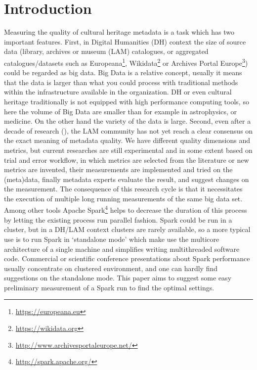 \section{Introduction}
Measuring the quality of cultural heritage metadata is a task which has two important features. First, in Digital Humanities (DH) context the size of source data (library, archives or museum (LAM) catalogues, or aggregated catalogues/datasets such as Europeana\footnote{\url{https://europeana.eu}}, Wikidata\footnote{\url{https://wikidata.org}} or Archives Portal Europe\footnote{\url{http://www.archivesportaleurope.net/}}) could be regarded as big data. Big Data is a relative concept, usually it means that the data is larger than what you could process with traditional methods within the infrastructure available in the organization. DH or even cultural heritage traditionally is not equipped with high performance computing tools, so here the volume of Big Data are smaller than for example in astrophysics, or medicine. On the other hand the variety of the data is large. Second, even after a decade of research (\cite{zotero-bibliography}), the LAM community has not yet reach a clear consensus on the exact meaning of metadata quality. We have different quality dimensions and metrics, but current researches are still experimental and in some extent based on trial and error workflow, in which metrics are selected from the literature or new metrics are invented, their measurements are implemented and tried on the (meta)data, finally metadata experts evaluate the result, and suggest changes on the measurement. The consequence of this research cycle is that it necessitates the execution of multiple long running measurements of the same big data set. Among other tools Apache Spark\footnote{\url{http://spark.apache.org/}} helps to decrease the duration of this process by letting the existing process run parallel fashion. Spark could be run in a cluster, but in a DH/LAM context clusters are rarely available, so a more typical use is to run Spark in `standalone mode' which make use the multicore architecture of a single machine and simplifies writing multithreaded software code. Commercial or scientific conference presentations about Spark performance usually concentrate on clustered environment, and one can hardly find suggestions on the standalone mode. This paper aims to suggest some easy preliminary measurement of a Spark run to find the optimal settings.

